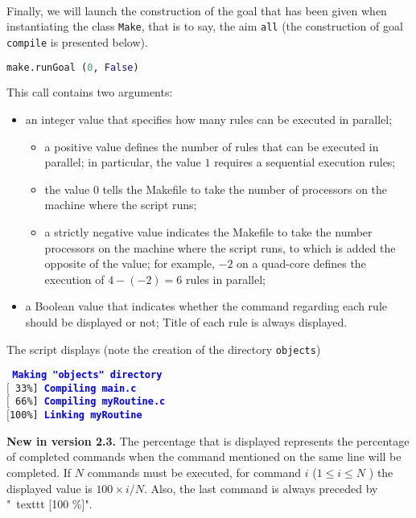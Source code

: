 \documentclass[a4paper,11pt]{extarticle}
\begin{document}
~\\Finally, we will launch the construction of the goal that has been given when instantiating the class \texttt{Make}, that is to say, the aim \texttt{all} (the construction of goal \texttt{compile} is presented below).

\begin{lstlisting}[language=py]
make.runGoal (0, False)
\end{lstlisting}


This call contains two arguments:
\begin{itemize}
\item an integer value that specifies how many rules can be executed in parallel;
  \begin{itemize}
  \item a positive value defines the number of rules that can be executed in parallel; in particular, the value $1$ requires a sequential execution rules;
  \item the value $0$ tells the Makefile to take the number of processors on the machine where the script runs;
  \item a strictly negative value indicates the Makefile to take the number processors on the machine where the script runs, to which is added the opposite of the value; for example, $-2$ on a quad-core defines the execution of $4-(-2) = 6$ rules in parallel;
  \end{itemize}
\item a Boolean value that indicates whether the command regarding each rule should be displayed or not; Title of each rule is always displayed.
\end{itemize}

The script displays (note the creation of the directory \texttt{objects})

\begin{mdframed}[hidealllines=true,backgroundcolor=lightgray!20]
\tt\footnotesize
\textcolor{blue}{\bf Making "objects" directory}\\
$[$~33\%]~\textcolor{blue}{\bf Compiling main.c}\\
$[$~66\%]~\textcolor{blue}{\bf Compiling myRoutine.c}\\
$[$100\%]~\textcolor{blue}{\bf Linking myRoutine}
\end{mdframed}

{\bf New in version 2.3.}\label{affichagePourcentage} The percentage that is displayed represents the percentage of completed commands when the command mentioned on the same line will be completed. If $N$ commands must be executed, for command $i$ ($1 \leqslant i \leqslant N$ ) the displayed value is $100 \times i / N$. Also, the last command is always preceded by "\ texttt {[100 \%]}".
\end{document}
